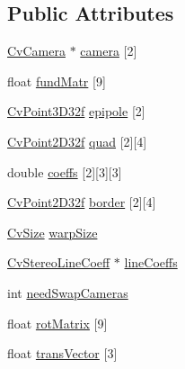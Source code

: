 \subsection*{Public Attributes}
\begin{DoxyCompactItemize}
\item 
\hyperlink{structCvCamera}{Cv\-Camera} $\ast$ \hyperlink{structCvStereoCamera_a646135b970708db9393e08ecb874f4bb}{camera} \mbox{[}2\mbox{]}
\item 
float \hyperlink{structCvStereoCamera_a0f1d899929ee07b59c06fd8284efd18e}{fund\-Matr} \mbox{[}9\mbox{]}
\item 
\hyperlink{structCvPoint3D32f}{Cv\-Point3\-D32f} \hyperlink{structCvStereoCamera_ab227708bf261abc8636eb58921a56700}{epipole} \mbox{[}2\mbox{]}
\item 
\hyperlink{structCvPoint2D32f}{Cv\-Point2\-D32f} \hyperlink{structCvStereoCamera_a1aa915655877e47f119825c0cace5473}{quad} \mbox{[}2\mbox{]}\mbox{[}4\mbox{]}
\item 
double \hyperlink{structCvStereoCamera_af05376d0e7e361967522b14fd53373bf}{coeffs} \mbox{[}2\mbox{]}\mbox{[}3\mbox{]}\mbox{[}3\mbox{]}
\item 
\hyperlink{structCvPoint2D32f}{Cv\-Point2\-D32f} \hyperlink{structCvStereoCamera_a5ada188887f9bfc33613d7db15fd3e32}{border} \mbox{[}2\mbox{]}\mbox{[}4\mbox{]}
\item 
\hyperlink{structCvSize}{Cv\-Size} \hyperlink{structCvStereoCamera_a16dc53a1985f186e6dbc225a1d2c4682}{warp\-Size}
\item 
\hyperlink{structCvStereoLineCoeff}{Cv\-Stereo\-Line\-Coeff} $\ast$ \hyperlink{structCvStereoCamera_a6587d80e1b870ec32bc9dfeda92f9949}{line\-Coeffs}
\item 
int \hyperlink{structCvStereoCamera_a202102897e4fc1c3b2000b1d537851fd}{need\-Swap\-Cameras}
\item 
float \hyperlink{structCvStereoCamera_a98e5355c4ccd0d4aa747685e28cbd11b}{rot\-Matrix} \mbox{[}9\mbox{]}
\item 
float \hyperlink{structCvStereoCamera_a65ab68375811fdefe09ef829c51629ef}{trans\-Vector} \mbox{[}3\mbox{]}
\end{DoxyCompactItemize}


